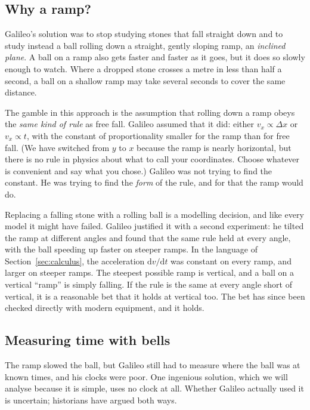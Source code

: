 \documentclass[11pt,twoside,openany]{book}
\newcommand{\dd}{\mathrm{d}}
\newcounter{check}[chapter]
\begin{document}
\subsection{Why a ramp?}

Galileo's solution was to stop studying stones that fall straight down and to study instead a ball rolling down a straight, gently sloping ramp, an \emph{inclined plane}. A ball on a ramp also gets faster and faster as it goes, but it does so slowly enough to watch. Where a dropped stone crosses a metre in less than half a second, a ball on a shallow ramp may take several seconds to cover the same distance.

The gamble in this approach is the assumption that rolling down a ramp obeys the \emph{same kind of rule} as free fall. Galileo assumed that it did: either $v_x \propto \Delta x$ or $v_x \propto t$, with the constant of proportionality smaller for the ramp than for free fall. (We have switched from $y$ to $x$ because the ramp is nearly horizontal, but there is no rule in physics about what to call your coordinates. Choose whatever is convenient and say what you chose.) Galileo was not trying to find the constant. He was trying to find the \emph{form} of the rule, and for that the ramp would do.

\begin{modelnote}
Replacing a falling stone with a rolling ball is a modelling decision, and like every model it might have failed. Galileo justified it with a second experiment: he tilted the ramp at different angles and found that the same rule held at every angle, with the ball speeding up faster on steeper ramps. In the language of Section~\ref{sec:calculus}, the acceleration $\dd v/\dd t$ was constant on every ramp, and larger on steeper ramps. The steepest possible ramp is vertical, and a ball on a vertical ``ramp'' is simply falling. If the rule is the same at every angle short of vertical, it is a reasonable bet that it holds at vertical too. The bet has since been checked directly with modern equipment, and it holds.
\end{modelnote}

\subsection{Measuring time with bells}

The ramp slowed the ball, but Galileo still had to measure where the ball was at known times, and his clocks were poor. One ingenious solution, which we will analyse because it is simple, uses no clock at all. Whether Galileo actually used it is uncertain; historians have argued both ways.
\end{document}
